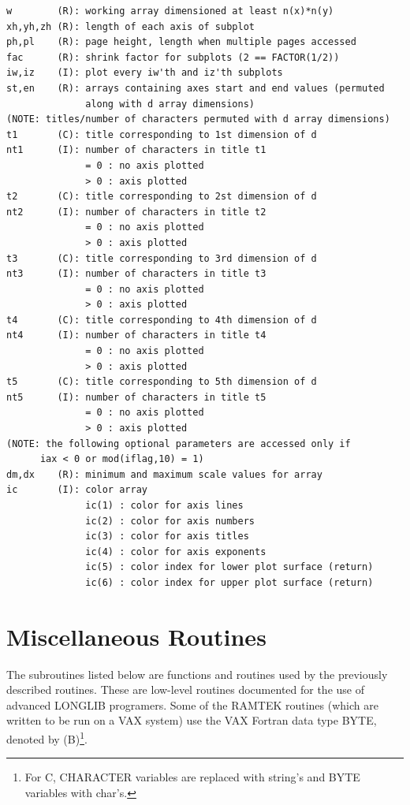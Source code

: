 \documentclass[11pt]{report}
\begin{document}
\begin{verbatim}
w        (R): working array dimensioned at least n(x)*n(y)
xh,yh,zh (R): length of each axis of subplot
ph,pl    (R): page height, length when multiple pages accessed
fac      (R): shrink factor for subplots (2 == FACTOR(1/2))
iw,iz    (I): plot every iw'th and iz'th subplots
st,en    (R): arrays containing axes start and end values (permuted
              along with d array dimensions)
(NOTE: titles/number of characters permuted with d array dimensions)
t1       (C): title corresponding to 1st dimension of d
nt1      (I): number of characters in title t1
              = 0 : no axis plotted
              > 0 : axis plotted
t2       (C): title corresponding to 2st dimension of d
nt2      (I): number of characters in title t2
              = 0 : no axis plotted
              > 0 : axis plotted
t3       (C): title corresponding to 3rd dimension of d
nt3      (I): number of characters in title t3
              = 0 : no axis plotted
              > 0 : axis plotted
t4       (C): title corresponding to 4th dimension of d
nt4      (I): number of characters in title t4
              = 0 : no axis plotted
              > 0 : axis plotted
t5       (C): title corresponding to 5th dimension of d
nt5      (I): number of characters in title t5
              = 0 : no axis plotted
              > 0 : axis plotted
(NOTE: the following optional parameters are accessed only if 
      iax < 0 or mod(iflag,10) = 1)
dm,dx    (R): minimum and maximum scale values for array
ic       (I): color array
              ic(1) : color for axis lines
              ic(2) : color for axis numbers
              ic(3) : color for axis titles
              ic(4) : color for axis exponents
              ic(5) : color index for lower plot surface (return)
              ic(6) : color index for upper plot surface (return)
\end{verbatim}


\chapter{Miscellaneous Routines}

The subroutines listed below are  functions and 
routines used by the previously described routines.  These are low-level
routines documented for the use of advanced LONGLIB programers.  Some of
the RAMTEK routines (which are written to be run on a VAX system) use
the VAX Fortran data type BYTE, denoted by (B)\footnote{For C, CHARACTER
variables are replaced with string's and BYTE variables with char's.}.
\end{document}
